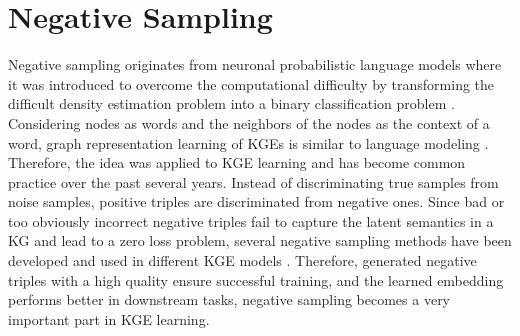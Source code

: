 \section{Negative Sampling}
\label{sec:negative_sampling}


Negative sampling originates from neuronal probabilistic language models where it was introduced to overcome the computational difficulty by transforming the difficult density estimation problem into a binary classification problem \cite{qianunderstanding}.
Considering nodes as words and the neighbors of the nodes as the context of a word, graph representation learning of \acp{KGE} is similar to language modeling \cite{qianunderstanding}.
Therefore, the idea was applied to \ac{KGE} learning and has become common practice over the past several years.
Instead of discriminating true samples from noise samples, positive triples are discriminated from negative ones.
Since bad or too obviously incorrect negative triples fail to capture the latent semantics in a \ac{KG} and lead to a zero loss problem, several negative sampling methods have been developed and used in different \ac{KGE} models \cite{qiannegative}.
Therefore, generated negative triples with a high quality ensure successful training, and the learned embedding performs better in downstream tasks, negative sampling becomes a very important part in \ac{KGE} learning.

